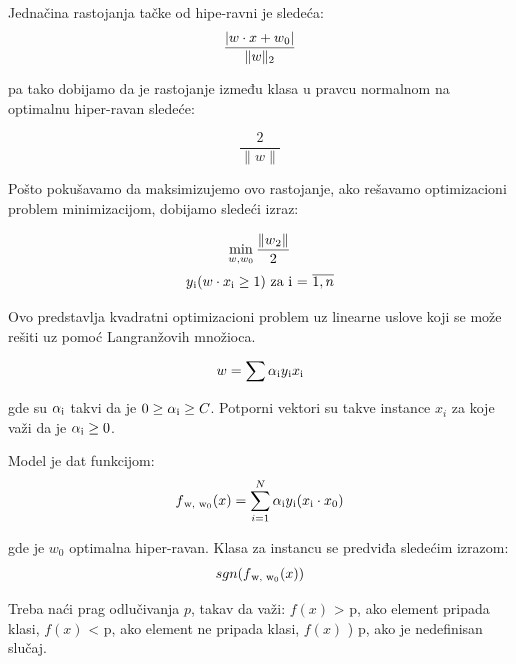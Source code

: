 \documentclass[12pt,oneside]{memoir}
\begin{document}
Jednačina rastojanja tačke od hipe-ravni je sledeća:
\begin{equation}
	\frac{|w \cdot x + w\textsubscript{0}|}{\|w\|\textsubscript{2}}
\end{equation}

pa tako dobijamo da je rastojanje između klasa u pravcu normalnom na optimalnu hiper-ravan sledeće:

\begin{equation}
	\frac{2}{\|w\|}
\end{equation}

Pošto pokušavamo da maksimizujemo ovo rastojanje,  ako rešavamo optimizacioni problem minimizacijom, dobijamo sledeći izraz:

\begin{equation}
	\min_{w,w_0} \frac{\|w\textsubscript{2}\|}{2} \\
\end{equation}
\begin{equation}
	y\textsubscript{i}(w \cdot x\textsubscript{i} \geq 1) \text{ za i = } \overline{1,n}
\end{equation}

Ovo predstavlja kvadratni optimizacioni problem uz linearne uslove koji se može rešiti uz pomoć Langranžovih množioca. 

\begin{equation}
	w = \sum \alpha\textsubscript{i}y\textsubscript{i}x\textsubscript{i}
\end{equation}

gde su $\alpha\textsubscript{i}$ takvi da je $0 \geq \alpha\textsubscript{i} \geq C$. Potporni vektori su takve instance $x_i$ za koje važi da je $\alpha\textsubscript{i} \geq 0$. 

Model je dat funkcijom:
\begin{equation}
	f\textsubscript{w, w\textsubscript{0}}(x) = \sum_{i=1}^{N} \alpha\textsubscript{i}y\textsubscript{i}(x\textsubscript{i} \cdot x\textsubscript{0})
\end{equation}

gde je $w_0$ optimalna hiper-ravan.  Klasa za instancu se predviđa sledećim izrazom:
\begin{equation}
	sgn(f\textsubscript{w, w\textsubscript{0}}(x))
\end{equation}

Treba naći prag odlučivanja $p$, takav da važi:
$f(x) $ > p, ako element pripada klasi, 
$f(x) $ < p, ako element ne pripada klasi, 
$f(x) $ ) p,  ako je nedefinisan slučaj. 
\end{document}
